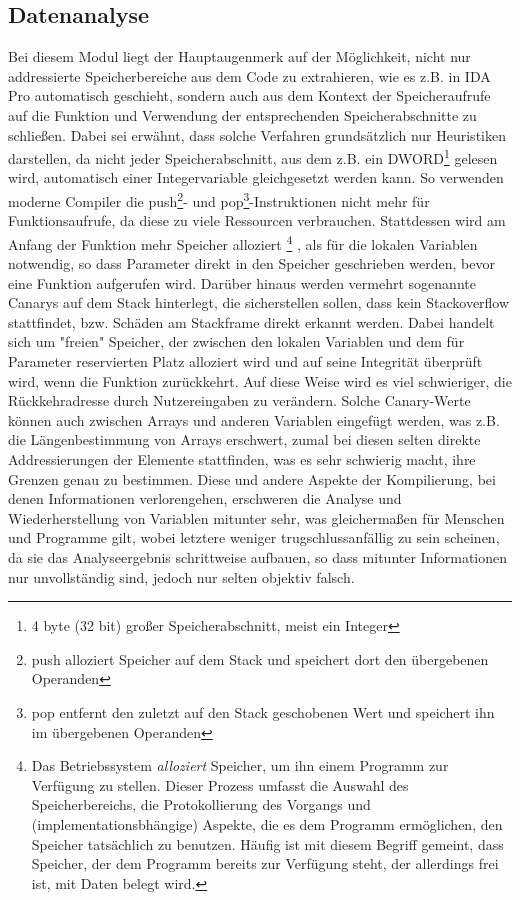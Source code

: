 \documentclass[11pt]{article}
\begin{document}
\subsection{Datenanalyse}
Bei diesem Modul liegt der Hauptaugenmerk auf der Möglichkeit, nicht nur
addressierte Speicherbereiche aus dem Code zu extrahieren, wie es z.B. in IDA Pro automatisch
geschieht, sondern auch aus dem Kontext der Speicheraufrufe auf die Funktion und Verwendung der
entsprechenden Speicherabschnitte zu schließen. Dabei sei erwähnt, dass solche Verfahren grundsätzlich nur
Heuristiken darstellen, da nicht jeder Speicherabschnitt, aus dem z.B. ein DWORD\footnote{4 byte (32
bit) großer Speicherabschnitt, meist ein Integer} gelesen wird, automatisch einer Integervariable
gleichgesetzt werden kann. So verwenden moderne Compiler die push\footnote{push alloziert Speicher
auf dem Stack und speichert dort den übergebenen Operanden}- und pop\footnote{pop entfernt den
zuletzt auf den Stack geschobenen Wert und speichert ihn im übergebenen Operanden}-Instruktionen
nicht mehr für Funktionsaufrufe, da diese zu viele Ressourcen verbrauchen. Stattdessen wird am
Anfang der Funktion mehr Speicher alloziert
\footnote{Das Betriebssystem \textit{alloziert} Speicher, um ihn einem Programm zur Verfügung zu
stellen. Dieser Prozess umfasst die Auswahl des Speicherbereichs, die Protokollierung des Vorgangs
und (implementationsbhängige) Aspekte, die es dem Programm ermöglichen, den Speicher tatsächlich
zu benutzen. Häufig ist mit diesem Begriff gemeint, dass Speicher, der dem Programm bereits zur Verfügung
steht, der allerdings frei ist, mit Daten belegt wird.}
, als für die lokalen Variablen notwendig, so dass
Parameter direkt in den Speicher geschrieben werden, bevor eine Funktion aufgerufen wird. Darüber
hinaus werden vermehrt sogenannte Canarys auf dem Stack hinterlegt, die sicherstellen sollen, dass
kein Stackoverflow stattfindet, bzw. Schäden am Stackframe direkt erkannt werden.
Dabei handelt sich um "freien" Speicher, der zwischen den lokalen
Variablen und dem für Parameter reservierten Platz alloziert wird und auf seine Integrität überprüft
wird, wenn die Funktion zurückkehrt. Auf diese Weise wird es viel schwieriger, die Rückkehradresse
durch Nutzereingaben zu verändern. Solche Canary-Werte können auch zwischen Arrays und anderen
Variablen eingefügt werden, was z.B. die Längenbestimmung von Arrays erschwert, zumal bei diesen
selten direkte Addressierungen der Elemente stattfinden, was es sehr schwierig macht, ihre Grenzen
genau zu bestimmen. Diese und andere Aspekte der Kompilierung, bei denen Informationen verlorengehen,
erschweren die Analyse und Wiederherstellung von Variablen mitunter sehr, was gleichermaßen für Menschen und
Programme gilt, wobei letztere weniger trugschlussanfällig zu sein scheinen, da sie das Analyseergebnis
schrittweise aufbauen, so dass mitunter Informationen nur unvollständig sind, jedoch nur selten objektiv falsch.
\end{document}
